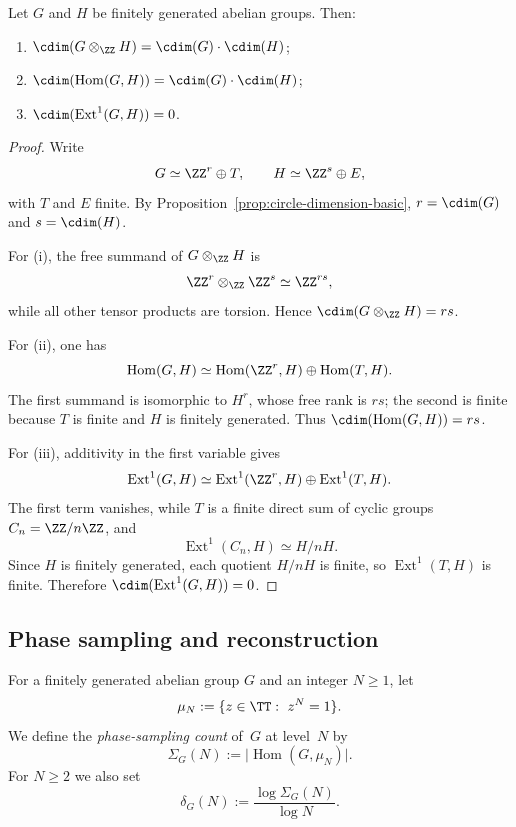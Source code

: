 \begin{proposition}%
\label{prop:cdim-tensor-hom-ext-laws}
Let $G$ and $H$ be finitely generated abelian groups.  Then:
\begin{enumerate}[label=(\roman*)]
\item
      $\cdim(G\otimes_{\ZZ}H)=\cdim(G)\cdot \cdim(H)$;
\item
      $\cdim(\operatorname{Hom}(G,H))=\cdim(G)\cdot \cdim(H)$;
\item
      $\cdim(\operatorname{Ext}^{1}(G,H))=0$.
\end{enumerate}
\end{proposition}

\begin{proof}
Write
\[
G\simeq \ZZ^r\oplus T,
\qquad
H\simeq \ZZ^s\oplus E,
\]
with $T$ and $E$ finite.  By
Proposition~\ref{prop:circle-dimension-basic},
$r=\cdim(G)$ and $s=\cdim(H)$.

For (i), the free summand of $G\otimes_{\ZZ}H$ is
\[
\ZZ^r\otimes_{\ZZ}\ZZ^s\simeq \ZZ^{rs},
\]
while all other tensor products are torsion.  Hence
$\cdim(G\otimes_{\ZZ}H)=rs$.

For (ii), one has
\[
\operatorname{Hom}(G,H)\simeq
\operatorname{Hom}(\ZZ^r,H)\oplus \operatorname{Hom}(T,H).
\]
The first summand is isomorphic to $H^r$, whose free rank is $rs$; the
second is finite because $T$ is finite and $H$ is finitely generated.
Thus $\cdim(\operatorname{Hom}(G,H))=rs$.

For (iii), additivity in the first variable gives
\[
\operatorname{Ext}^{1}(G,H)\simeq
\operatorname{Ext}^{1}(\ZZ^r,H)\oplus \operatorname{Ext}^{1}(T,H).
\]
The first term vanishes, while $T$ is a finite direct sum of cyclic
groups $C_n=\ZZ/n\ZZ$, and
\[
\operatorname{Ext}^{1}(C_n,H)\simeq H/nH.
\]
Since $H$ is finitely generated, each quotient $H/nH$ is finite, so
$\operatorname{Ext}^{1}(T,H)$ is finite.  Therefore
$\cdim(\operatorname{Ext}^{1}(G,H))=0$.
\end{proof}

\subsection{Phase sampling and reconstruction}

\begin{definition}\label{def:cdim-phase-spectrum}
For a finitely generated abelian group $G$ and an integer $N\ge 1$, let
\[
\mu_N:=\{z\in \TT:\ z^N=1\}.
\]
We define the \emph{phase-sampling count} of~$G$ at level~$N$ by
\[
\Sigma_G(N):=\bigl|\operatorname{Hom}(G,\mu_N)\bigr|.
\]
For $N\ge 2$ we also set
\[
\delta_G(N):=\frac{\log \Sigma_G(N)}{\log N}.
\]
\end{definition}

